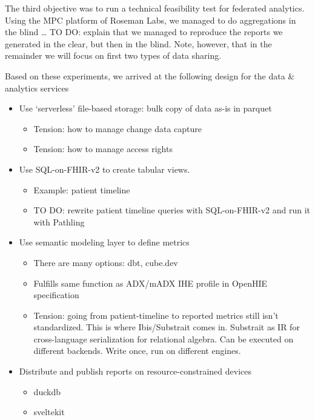 \documentclass[
  authoryear]{elsarticle}
\providecommand{\tightlist}{%
  \setlength{\itemsep}{0pt}\setlength{\parskip}{0pt}}\usepackage{longtable,booktabs,array}
\begin{document}
The third objective was to run a technical feasibility test for
federated analytics. Using the MPC platform of Roseman Labs, we managed
to do aggregations in the blind \ldots{} TO DO: explain that we managed
to reproduce the reports we generated in the clear, but then in the
blind. Note, however, that in the remainder we will focus on first two
types of data sharing.

Based on these experiments, we arrived at the following design for the
data \& analytics services

\begin{itemize}
\tightlist
\item
  Use `serverless' file-based storage: bulk copy of data as-is in
  parquet

  \begin{itemize}
  \tightlist
  \item
    Tension: how to manage change data capture
  \item
    Tension: how to manage access rights
  \end{itemize}
\item
  Use SQL-on-FHIR-v2 to create tabular views.

  \begin{itemize}
  \tightlist
  \item
    Example: patient timeline
  \item
    TO DO: rewrite patient timeline queries with SQL-on-FHIR-v2 and run
    it with Pathling
  \end{itemize}
\item
  Use semantic modeling layer to define metrics

  \begin{itemize}
  \tightlist
  \item
    There are many options: dbt, cube.dev
  \item
    Fulfills same function as ADX/mADX IHE profile in OpenHIE
    specification
  \item
    Tension: going from patient-timeline to reported metrics still isn't
    standardized. This is where Ibis/Substrait comes in. Substrait as IR
    for cross-language serialization for relational algebra. Can be
    executed on different backends. Write once, run on different
    engines.
  \end{itemize}
\item
  Distribute and publish reports on resource-constrained devices

  \begin{itemize}
  \tightlist
  \item
    duckdb
  \item
    sveltekit
  \end{itemize}
\end{itemize}
\end{document}
